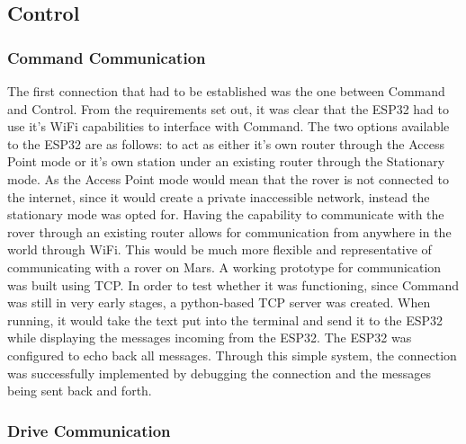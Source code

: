 \documentclass[a4paper]{article}
\begin{document}
\subsection{Control} 

\subsubsection{Command Communication}

The first connection that had to be established was the one between Command 
and Control. From the requirements set out, it was clear that the ESP32 
had to use it’s WiFi capabilities to interface with Command. The two 
options available to the ESP32 are as follows: to act as either it's own 
router through the Access Point mode or it's own station under an existing 
router through the Stationary mode. As the Access Point mode would mean 
that the rover is not connected to the internet, since it would create a 
private inaccessible network, instead the stationary mode was opted for. 
Having the capability to communicate with the rover through an existing 
router allows for communication from anywhere in the world through WiFi. 
This would be much more flexible and representative of communicating with 
a rover on Mars. A working prototype for communication was built using 
TCP. In order to test whether it was functioning, since Command was still 
in very early stages, a python-based TCP server was created. When running, 
it would take the text put into the terminal and send it to the ESP32 
while displaying the messages incoming from the ESP32. The ESP32 was 
configured to echo back all messages. Through this simple system, the 
connection was successfully implemented by debugging the connection and 
the messages being sent back and forth.

\subsubsection{Drive Communication}
\end{document}
